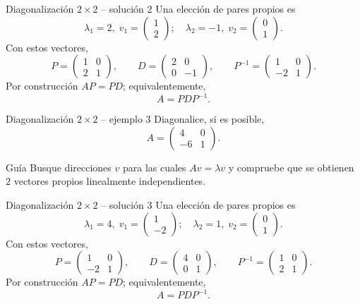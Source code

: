 \documentclass[aspectratio=169,10pt]{beamer}
\begin{document}
\begin{frame}{Diagonalización $2\times 2$ -- solución 2}
\scriptsize
Una elección de pares propios es
\[
\lambda_1=2,\;v_1=\begin{pmatrix}1\\2\end{pmatrix};\quad \lambda_2=-1,\;v_2=\begin{pmatrix}0\\1\end{pmatrix}.
\]
Con estos vectores,
\[
P=\begin{pmatrix}1 & 0\\2 & 1\end{pmatrix},\qquad D=\begin{pmatrix}2 & 0\\0 & -1\end{pmatrix},\qquad P^{-1}=\begin{pmatrix}1 & 0\\-2 & 1\end{pmatrix}.
\]
Por construcción $AP=PD$; equivalentemente,
\[
\boxed{A=PDP^{-1}}.
\]
\end{frame}
\begin{frame}{Diagonalización $2\times 2$ -- ejemplo 3}
\small
Diagonalice, si es posible,
\[
A=\begin{pmatrix}4 & 0\\-6 & 1\end{pmatrix}.
\]
\begin{block}{Guía}
Busque direcciones $v$ para las cuales $Av=\lambda v$ y compruebe que se obtienen $2$ vectores propios linealmente independientes.
\end{block}
\end{frame}
\begin{frame}{Diagonalización $2\times 2$ -- solución 3}
\scriptsize
Una elección de pares propios es
\[
\lambda_1=4,\;v_1=\begin{pmatrix}1\\-2\end{pmatrix};\quad \lambda_2=1,\;v_2=\begin{pmatrix}0\\1\end{pmatrix}.
\]
Con estos vectores,
\[
P=\begin{pmatrix}1 & 0\\-2 & 1\end{pmatrix},\qquad D=\begin{pmatrix}4 & 0\\0 & 1\end{pmatrix},\qquad P^{-1}=\begin{pmatrix}1 & 0\\2 & 1\end{pmatrix}.
\]
Por construcción $AP=PD$; equivalentemente,
\[
\boxed{A=PDP^{-1}}.
\]
\end{frame}
\end{document}
